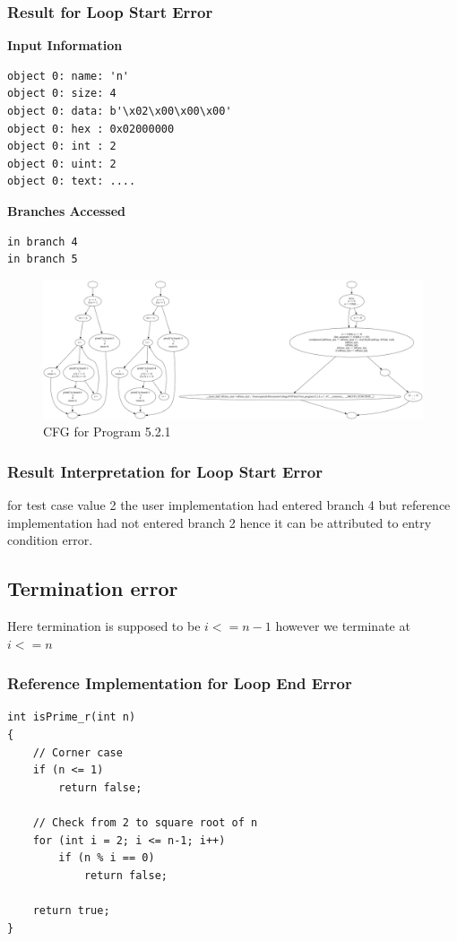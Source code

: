 \subsubsection{Result for Loop Start Error}
\textbf{Input Information}
\begin{verbatim}
object 0: name: 'n'
object 0: size: 4
object 0: data: b'\x02\x00\x00\x00'
object 0: hex : 0x02000000
object 0: int : 2
object 0: uint: 2
object 0: text: ....
\end{verbatim}


\textbf{Branches Accessed}
\begin{verbatim}
in branch 4
in branch 5
\end{verbatim}
\begin{figure}[h]
\centering
\includegraphics[width=1\textwidth]{5/5.2.1.c.png}
\caption{CFG for Program 5.2.1}
\label{fig:cfg5.2.1}
\end{figure}
\subsubsection{Result Interpretation for Loop Start Error}
for test case value 2 the user implementation had entered branch 4 but reference implementation had not entered branch 2 hence it can be attributed to entry condition error.
\subsection{Termination error}
Here termination is supposed to be $i<=n-1$ however we terminate at $i<=n$
\subsubsection{Reference Implementation for Loop End Error}
\begin{verbatim}
int isPrime_r(int n)
{
    // Corner case
    if (n <= 1)
        return false;
 
    // Check from 2 to square root of n
    for (int i = 2; i <= n-1; i++)
        if (n % i == 0)
            return false;
 
    return true;
}
\end{verbatim}
